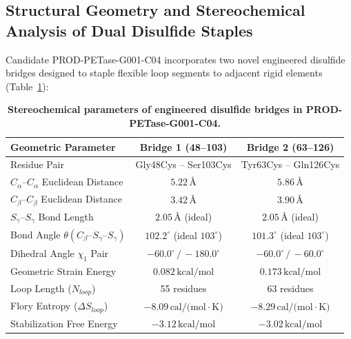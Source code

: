 \documentclass[10pt,twocolumn,a4paper]{article}
\begin{document}
\subsection{Structural Geometry and Stereochemical Analysis of Dual Disulfide Staples}
Candidate PROD-PETase-G001-C04 incorporates two novel engineered disulfide bridges designed to staple flexible loop segments to adjacent rigid elements (Table~\ref{tab:disulfides}):

\begin{table}[H]
\centering
\small
\caption{\textbf{Stereochemical parameters of engineered disulfide bridges in PROD-PETase-G001-C04.}}
\label{tab:disulfides}
\begin{tabular}{lcc}
\toprule
\textbf{Geometric Parameter} & \textbf{Bridge 1 (48--103)} & \textbf{Bridge 2 (63--126)} \\
\midrule
Residue Pair & Gly48Cys -- Ser103Cys & Tyr63Cys -- Gln126Cys \\
$C_\alpha\text{--}C_\alpha$ Euclidean Distance & $5.22\,\text{\AA}$ & $5.86\,\text{\AA}$ \\
$C_\beta\text{--}C_\beta$ Euclidean Distance & $3.42\,\text{\AA}$ & $3.90\,\text{\AA}$ \\
$S_\gamma\text{--}S_\gamma$ Bond Length & $2.05\,\text{\AA}$ (ideal) & $2.05\,\text{\AA}$ (ideal) \\
Bond Angle $\theta(C_\beta\text{--}S_\gamma\text{--}S_\gamma)$ & $102.2^\circ$ (ideal $103^\circ$) & $101.3^\circ$ (ideal $103^\circ$) \\
Dihedral Angle $\chi_1$ Pair & $-60.0^\circ\,/\,-180.0^\circ$ & $-60.0^\circ\,/\,-60.0^\circ$ \\
Geometric Strain Energy & $0.082\,\text{kcal/mol}$ & $0.173\,\text{kcal/mol}$ \\
Loop Length ($N_{loop}$) & 55 residues & 63 residues \\
Flory Entropy ($\Delta S_{loop}$) & $-8.09\,\text{cal/(mol}\cdot\text{K)}$ & $-8.29\,\text{cal/(mol}\cdot\text{K)}$ \\
Stabilization Free Energy & $-3.12\,\text{kcal/mol}$ & $-3.02\,\text{kcal/mol}$ \\
\bottomrule
\end{tabular}
\end{table}
\end{document}
